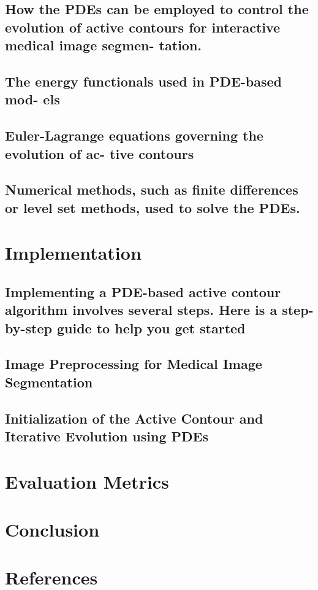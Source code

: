 \documentclass[]{report}
\begin{document}
\subsection{How the PDEs can be employed to control the evolution
of active contours for interactive medical image segmen-
tation.}
\subsection{The energy functionals used in PDE-based mod-
els}
\subsection{Euler-Lagrange equations governing the evolution of ac-
tive contours}
\subsection{Numerical methods, such as finite differences or level set methods, used to solve the PDEs.}
\section{Implementation}
\subsection{Implementing a PDE-based active contour algorithm involves several steps. Here is a step-by-step guide to help you get started}
\subsection{Image Preprocessing for Medical Image Segmentation}
\subsection{Initialization of the Active Contour and Iterative Evolution
using PDEs}
\section{Evaluation Metrics}
\section{Conclusion}
\section{References}
\end{document}
